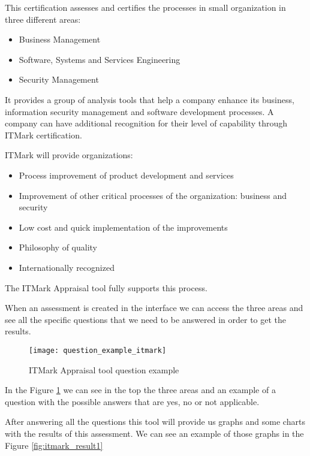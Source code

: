 This certification assesses and certifies the processes in small organization in three different areas:
\begin{itemize}
	\item Business Management
	\item Software, Systems and Services Engineering
	\item Security Management
\end{itemize}

It provides a group of analysis tools that help a company enhance its business, information security management and software development processes. A company can have additional recognition for their level of capability through ITMark certification.

ITMark will provide organizations:
\begin{itemize}
	\item Process improvement of product development and services
	\item Improvement of other critical processes of the organization: business and security
	\item Low cost and quick implementation of the improvements
	\item Philosophy of quality
	\item Internationally recognized
\end{itemize}

The ITMark Appraisal tool fully supports this process.


When an assessment is created in the interface we can access the three areas and see all the specific questions that we need to be answered in order to get the results.

\begin{figure}[h]
	\begin{center}
		\leavevmode
		\texttt{[image: question\_example\_itmark]}
		\caption{ITMark Appraisal tool question example}
		\label{fig:itmark_question}
	\end{center}
\end{figure}

In the Figure \ref{fig:itmark_question} we can see in the top the three areas and an example of a question with the possible answers that are yes, no or not applicable.

After answering all the questions this tool will provide us graphs and some charts with the results of this assessment. We can see an example of those graphs in the Figure \ref{fig:itmark_result1}

